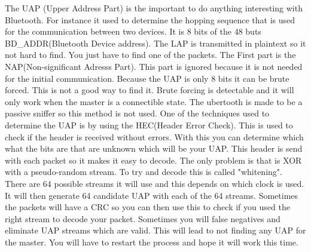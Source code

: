 The UAP (Upper Address Part) is the important to do anything interesting with Bluetooth. For instance it used to determine the hopping sequence that is used for the communication between two devices. It is 8 bits of the 48 buts BD_ADDR(Bluetooth Device address). The LAP is transmitted in plaintext so it not hard to find. You just have to find one of the packets. The First part is the NAP(Non-significant Adresss Part). This part is ignored because it is not needed for the initial communication. Because the UAP is only 8 bits it can be brute forced. This is not a good way to find it. Brute forcing is detectable and it will only work when the master is a connectible state. 
The ubertooth is made to be a passive sniffer so this method is not used. One of the techniques used to determine the UAP is by using the HEC(Header Error Check). This is used to check if the header is received without errors. With this you can determine which what the bits are that are unknown which will be your UAP. This header is send with each packet so it makes it easy to decode. The only problem is that is XOR with a pseudo-random stream. To try and decode this is called "whitening". There are 64 possible streams it will use and this depends on which clock is used. It will then generate 64 candidate UAP with each of the 64 streams. Sometimes the packets will have a CRC so you can then use this to check if you used the right stream to decode your packet.
Sometimes you will false negatives and eliminate UAP streams which are valid. This will lead to not finding any UAP for the master. You will have to restart the process and hope it will work this time.